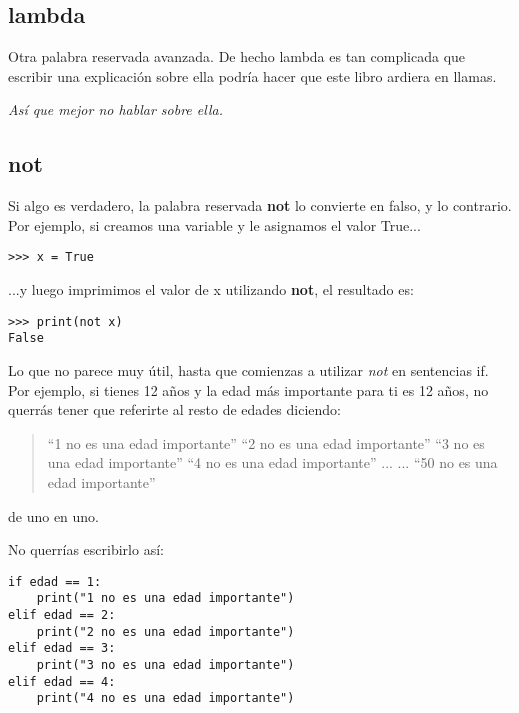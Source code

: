 \subsection*{lambda}

Otra palabra reservada avanzada. De hecho lambda es tan complicada que escribir una explicación sobre ella podría hacer que este libro ardiera en llamas.
\par
\emph{Así que mejor no hablar sobre ella.}

\subsection*{not}

Si algo es verdadero, la palabra reservada \textbf{not} lo convierte en falso, y lo contrario.  Por ejemplo, si creamos una variable  y le asignamos el valor True...

\begin{listing}
\begin{verbatim}
>>> x = True
\end{verbatim}
\end{listing}

...y luego imprimimos el valor de x utilizando \textbf{not}, el resultado es:

\begin{listing}
\begin{verbatim}
>>> print(not x)
False
\end{verbatim}
\end{listing}

Lo que no parece muy útil, hasta que comienzas a utilizar \textit{not} en sentencias if.  Por ejemplo, si tienes 12 años y la edad más importante para ti es 12 años, no querrás tener que referirte al resto de edades diciendo:

\begin{quotation}
``1 no es una edad importante''
``2 no es una edad importante''
``3 no es una edad importante''
``4 no es una edad importante''
...
...
``50 no es una edad importante''
\end{quotation}

de uno en uno.
\par\noindent
No querrías escribirlo así:

\begin{listing}
\begin{verbatim}
if edad == 1:
    print("1 no es una edad importante")
elif edad == 2:
    print("2 no es una edad importante")
elif edad == 3:
    print("3 no es una edad importante")
elif edad == 4:
    print("4 no es una edad importante")
\end{verbatim}
\end{listing}

